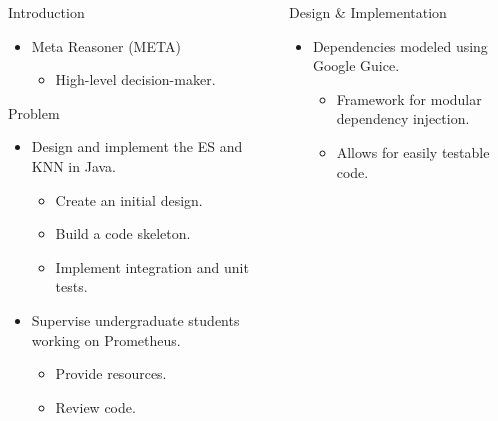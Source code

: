 \documentclass[final]{beamer} %
\newlength{\columnheight}
\begin{document}
\begin{frame}
\begin{columns}
\begin{column}{.3\textwidth}
{\begin{block}{Introduction}
					\begin{itemize}
						\item Meta Reasoner (META)
						\begin{itemize}
							\item High-level decision-maker.
						\end{itemize}
					\end{itemize}
				
				\end{block}
				\begin{block}{Problem}
				\begin{itemize}
					\item Design and implement the ES and KNN in Java.
					\begin{itemize}
						\item Create an initial design.
						\item Build a code skeleton.
						\item Implement integration and unit tests.
					\end{itemize}
				
					\item Supervise undergraduate students working on Prometheus.
					\begin{itemize}
						\item Provide resources.
						\item Review code.
					\end{itemize}
				\end{itemize}
				\end{block}
			}
			\end{column}
			\begin{column}{.34\textwidth}
				\parbox[t][\columnheight]{\textwidth}{
				\begin{block}{Design \& Implementation}
					\begin{itemize}
						\item Dependencies modeled using Google Guice.
						\begin{itemize}
							\item Framework for modular dependency injection.
							\item Allows for easily testable code.
						\end{itemize}
					\end{itemize}
					
					

\end{block}}
\end{column}
\end{columns}
\end{frame}
\end{document}
